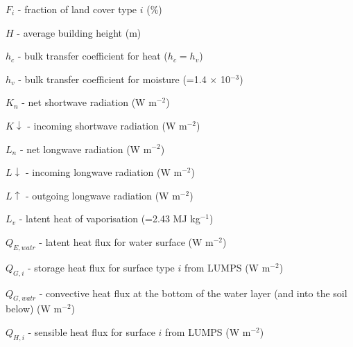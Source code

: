 {\begin{description}
\item $F_{i}$ - fraction of land cover type $i$ (\%)
\item \ensuremath{H} - average building height (m)
\item \ensuremath{h_{c}} - bulk transfer coefficient for heat ($h_{c} = h_{v}$)
\item \ensuremath{h_{v}} - bulk transfer coefficient for moisture (=1.4 $\times$ 10$^{-3}$)
\item \ensuremath{K_{n}} - net shortwave radiation (W m$^{-2}$)
\item \ensuremath{K\downarrow} - incoming shortwave radiation (W m$^{-2}$)
\item \ensuremath{L_{n}} - net longwave radiation (W m$^{-2}$)
\item \ensuremath{L\downarrow} - incoming longwave radiation (W m$^{-2}$)
\item \ensuremath{L\uparrow} - outgoing longwave radiation (W m$^{-2}$)
\item \ensuremath{L_{v}} - latent heat of vaporisation (=2.43 MJ kg$^{-1}$)

\item \ensuremath{Q_{E,watr}} - latent heat flux for water surface  (W m$^{-2}$)
\item \ensuremath{Q_{G,i}} - storage heat flux for surface type $i$ from LUMPS (W m$^{-2}$)
\item \ensuremath{Q_{G,watr}} - convective heat flux at the bottom of the water layer (and into the soil below) (W m$^{-2}$)
\item \ensuremath{Q_{H,i}} - sensible heat flux for surface $i$ from LUMPS (W m$^{-2}$)


\end{description}}
